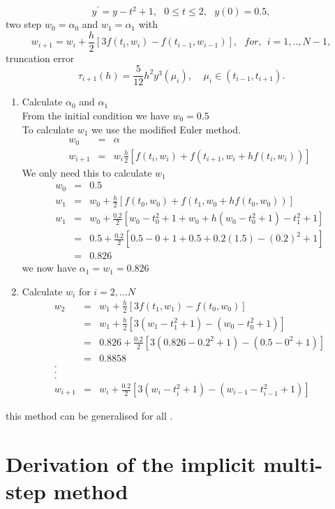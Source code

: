 \begin{example}
\[ y^{'}=y-t^2+1, \ \ \ 0 \leq t \leq 2, \ \ \ y(0)=0.5, \]
 two step
$w_0=\alpha_0$ and $w_1=\alpha_1$ with
\[w_{i+1}=w_i+\frac{h}{2}[3f(t_i,w_{i})-f(t_{i-1},w_{i-1})], \ \ \ for, \ \ i=1,..,N-1, \]
truncation error \[ \tau_{i+1}(h)=\frac{5}{12}h^2 y^3(\mu_i), \ \ \ \ \ \mu_i \in (t_{i-1},t_{i+1}).\]
\begin{enumerate}
\item Calculate $\alpha_0$ and $\alpha_1$\\
From the initial condition we have $w_0=0.5$\\
To calculate $w_1$ we use the modified Euler method.
\begin{eqnarray*}
w_0&=&\alpha\\
w_{i+1} &=& w_i \frac{h}{2}[f(t_i,w_i)+f(t_{i+1},w_i+hf(t_i,w_i))] 
\end{eqnarray*}
We only need this to calculate $w_1$
\begin{eqnarray*}
w_0&=&0.5\\
w_{1} &=& w_0 +\frac{h}{2}[f(t_0,w_0)+f(t_{1},w_0+hf(t_0,w_0))] \\
w_{1} &=& w_0 +\frac{0.2}{2}[w_0-t^2_0+1+w_0+h(w_0-t^2_0+1)-t_1^2+1] \\
 &=& 0.5 +\frac{0.2}{2}[0.5-0+1+0.5+0.2(1.5)-(0.2)^2+1] \\
 &=& 0.826
\end{eqnarray*}
we now have $\alpha_1=w_1=0.826$
\item Calculate $w_i$ for $i=2,...N$
\begin{eqnarray*}
w_{2}&=&w_1+\frac{h}{2}[3f(t_1,w_{1})-f(t_0,w_{0})] \\
&=&w_1+\frac{h}{2}[3(w_{1}-t_1^2+1)-(w_{0}-t_0^2+1)] \\
&=&0.826+\frac{0.2}{2}[3(0.826-0.2^2+1)-(0.5-0^2+1)] \\
&=&0.8858 \\
.\\
.\\
.\\
w_{i+1}&=&w_i+\frac{0.2}{2}[3(w_{i}-t_i^2+1)-(w_{i-1}-t_{i-1}^2+1)] 
\end{eqnarray*}
\end{enumerate}
this method can be generalised for all .
\end{example}

\section{Derivation of the implicit multi-step method}


